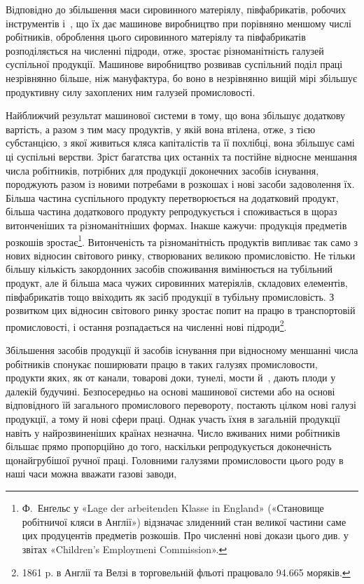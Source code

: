 Відповідно до збільшення маси сировинного матеріялу, півфабрикатів,
робочих інструментів і~, що їх дає машинове
виробництво при порівняно меншому числі робітників,
оброблення цього сировинного матеріялу та півфабрикатів розподіляється
на численні підроди, отже, зростає різноманітність
галузей суспільної продукції. Машинове виробництво розвивав
суспільний поділ праці незрівнянно більше, ніж мануфактура,
бо воно в незрівнянно вищій мірі збільшує продуктивну силу
захоплених ним галузей промисловості.

Найближчий результат машинової системи в тому, що вона
збільшує додаткову вартість, а разом з тим масу продуктів, у
якій вона втілена, отже, з тією субстанцією, з якої живиться
кляса капіталістів та її похлібці, вона збільшує самі ці суспільні
верстви. Зріст багатства цих останніх та постійне відносне меншання
числа робітників, потрібних для продукції доконечних
засобів існування, породжують разом із новими потребами в розкошах
і нові засоби задоволення їх. Більша частина суспільного
продукту перетворюється на додатковий продукт, більша частина
додаткового продукту репродукується і споживається в щораз
витонченіших та різноманітніших формах. Інакше кажучи: продукція
предметів розкошів зростає\footnote{
Ф.~Енґельс у «Lage der arbeitenden Klasse in England» («Становище
робітничої кляси в Англії») відзначає злиденний стан великої частини
саме цих продуцентів предметів розкошів. Про численні нові докази
цього див. у звітах «Children’s Employmeni Commission».
}. Витонченість та різноманітність
продуктів випливає так само з нових відносин світового
ринку, створюваних великою промисловістю. Не тільки
більшу кількість закордонних засобів споживання вимінюється
на тубільний продукт, але й більша маса чужих сировинних матеріялів,
складових елементів, півфабрикатів тощо ввіходить
як засіб продукції в тубільну промисловість. З розвитком цих
відносин світового ринку зростає попит на працю в транспортовій
промисловості, і остання розпадається на численні нові
підроди\footnote{
1861 p. в Англії та Велзі в торговельній фльоті працювало \num{94.665}
моряків.
}.

Збільшення засобів продукції й засобів існування при відносному
меншанні числа робітників спонукає поширювати працю в
таких галузях промисловости, продукти яких, як от канали,
товарові доки, тунелі, мости й~, дають плоди у далекій будучині.
Безпосередньо на основі машинової системи або на основі
відповідного їй загального промислового перевороту, постають
цілком нові галузі продукції, а тому й нові сфери праці. Однак
участь їхня в загальній продукції навіть у найрозвиненіших
країнах незначна. Число вживаних ними робітників більшає
прямо пропорційно до того, наскільки репродукується доконечність
щонайгрубішої ручної праці. Головними галузями промисловости
цього роду в наші часи можна вважати газові заводи,
\parbreak{}  %

